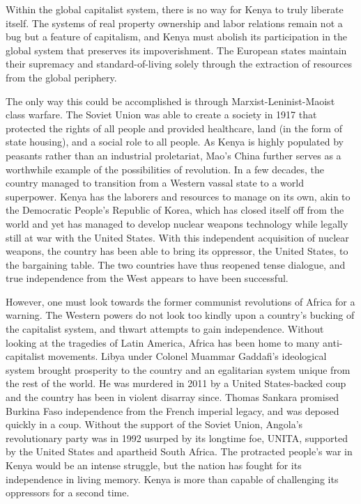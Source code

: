\documentclass[american]{../../../coursework}
\begin{document}
Within the global capitalist system, there is no way for Kenya to truly
liberate itself. The systems of real property ownership and labor relations
remain not a bug but a feature of capitalism, and Kenya must abolish its
participation in the global system that preserves its impoverishment. The
European states maintain their supremacy and standard-of-living solely through
the extraction of resources from the global periphery.

The only way this could be accomplished is through Marxist-Leninist-Maoist
class warfare. The Soviet Union was able to create a society in 1917 that
protected the rights of all people and provided healthcare, land (in the form
of state housing), and a social role to all people. As Kenya is highly
populated by peasants rather than an industrial proletariat, Mao's China
further serves as a worthwhile example of the possibilities of revolution. In
a few decades, the country managed to transition from a Western vassal state
to a world superpower. Kenya has the laborers and resources to manage on its
own, akin to the Democratic People's Republic of Korea, which has closed
itself off from the world and yet has managed to develop nuclear weapons
technology while legally still at war with the United States. With this
independent acquisition of nuclear weapons, the country has been able to bring
its oppressor, the United States, to the bargaining table. The two countries
have thus reopened tense dialogue, and true independence from the West appears
to have been successful.

However, one must look towards the former communist revolutions of Africa for
a warning. The Western powers do not look too kindly upon a country's bucking
of the capitalist system, and thwart attempts to gain independence. Without
looking at the tragedies of Latin America, Africa has been home to many
anti-capitalist movements. Libya under Colonel Muammar Gaddafi's ideological
system brought prosperity to the country and an egalitarian system unique from
the rest of the world. He was murdered in 2011 by a United States-backed coup
and the country has been in violent disarray since. Thomas Sankara promised
Burkina Faso independence from the French imperial legacy, and was deposed
quickly in a coup. Without the support of the Soviet Union, Angola's
revolutionary party was in 1992 usurped by its longtime foe, UNITA, supported
by the United States and apartheid South Africa. The protracted people's war
in Kenya would be an intense struggle, but the nation has fought for its
independence in living memory. Kenya is more than capable of challenging its
oppressors for a second time.

\fi

\printbibliography
\end{document}
